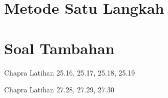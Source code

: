 \section{Metode Satu Langkah}











\section{Soal Tambahan}

Chapra Latihan 25.16, 25.17, 25.18, 25.19

Chapra Latihan 27.28, 27.29, 27.30


